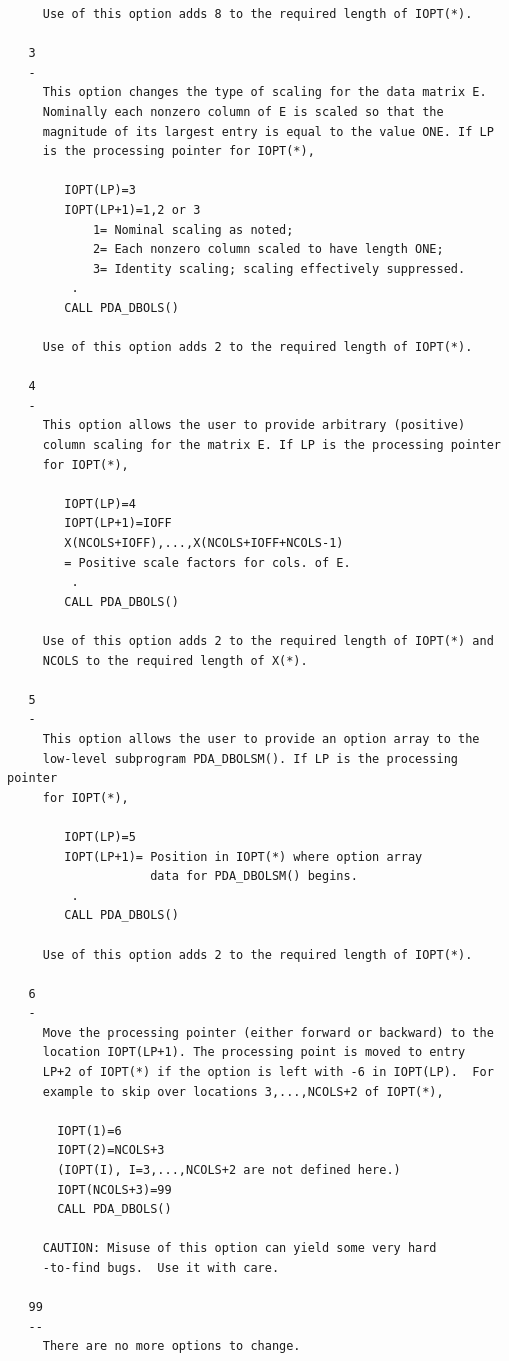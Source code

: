 \documentclass[11pt,twoside]{article}
\begin{document}
\begin{verbatim}
     Use of this option adds 8 to the required length of IOPT(*).

   3
   -
     This option changes the type of scaling for the data matrix E.
     Nominally each nonzero column of E is scaled so that the
     magnitude of its largest entry is equal to the value ONE. If LP
     is the processing pointer for IOPT(*),

        IOPT(LP)=3
        IOPT(LP+1)=1,2 or 3
            1= Nominal scaling as noted;
            2= Each nonzero column scaled to have length ONE;
            3= Identity scaling; scaling effectively suppressed.
         .
        CALL PDA_DBOLS()

     Use of this option adds 2 to the required length of IOPT(*).

   4
   -
     This option allows the user to provide arbitrary (positive)
     column scaling for the matrix E. If LP is the processing pointer
     for IOPT(*),

        IOPT(LP)=4
        IOPT(LP+1)=IOFF
        X(NCOLS+IOFF),...,X(NCOLS+IOFF+NCOLS-1)
        = Positive scale factors for cols. of E.
         .
        CALL PDA_DBOLS()

     Use of this option adds 2 to the required length of IOPT(*) and
     NCOLS to the required length of X(*).

   5
   -
     This option allows the user to provide an option array to the
     low-level subprogram PDA_DBOLSM(). If LP is the processing pointer
     for IOPT(*),

        IOPT(LP)=5
        IOPT(LP+1)= Position in IOPT(*) where option array
                    data for PDA_DBOLSM() begins.
         .
        CALL PDA_DBOLS()

     Use of this option adds 2 to the required length of IOPT(*).

   6
   -
     Move the processing pointer (either forward or backward) to the
     location IOPT(LP+1). The processing point is moved to entry
     LP+2 of IOPT(*) if the option is left with -6 in IOPT(LP).  For
     example to skip over locations 3,...,NCOLS+2 of IOPT(*),

       IOPT(1)=6
       IOPT(2)=NCOLS+3
       (IOPT(I), I=3,...,NCOLS+2 are not defined here.)
       IOPT(NCOLS+3)=99
       CALL PDA_DBOLS()

     CAUTION: Misuse of this option can yield some very hard
     -to-find bugs.  Use it with care.

   99
   --
     There are no more options to change.


\end{verbatim}
\end{document}
